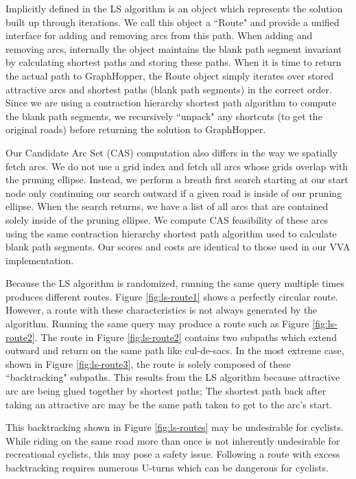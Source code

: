 \documentclass[11pt]{article}
\begin{document}
Implicitly defined in the LS algorithm is an object which represents the solution built up through iterations. We call this object a ``Route" and provide a unified interface for adding and removing arcs from this path. When adding and removing arcs, internally the object maintains the blank path segment invariant by calculating shortest paths and storing these paths. When it is time to return the actual path to GraphHopper, the Route object simply iterates over stored attractive arcs and shortest paths (blank path segments) in the correct order. Since we are using a contraction hierarchy shortest path algorithm to compute the blank path segments, we recursively ``unpack" any shortcuts (to get the original roads) before returning the solution to GraphHopper. 

Our Candidate Arc Set (CAS) computation also differs in the way we spatially fetch arcs. We do not use a grid index and fetch all arcs whose grids overlap with the pruning ellipse.  Instead, we perform a breath first search starting at our start node only continuing our search outward if a given road is inside of our pruning ellipse. When the search returns, we have a list of all arcs that are contained solely inside of the pruning ellipse. We compute CAS feasibility of these arcs using the same contraction hierarchy shortest path algorithm used to calculate blank path segments. Our scores and costs are identical to those used in our VVA implementation.

Because the LS algorithm is randomized, running the same query multiple times produces different routes. Figure \ref{fig:ls-route1} shows a perfectly circular route. However, a route with these characteristics is not always generated by the algorithm. Running the same query may produce a route such as Figure \ref{fig:ls-route2}. The route in Figure \ref{fig:ls-route2} contains two subpaths which extend outward and return on the same path like cul-de-sacs. In the most extreme case, shown in Figure \ref{fig:ls-route3}, the route is solely composed of these ``backtracking" subpaths. This results from the LS algorithm because attractive arc are being glued together by shortest paths; The shortest path back after taking an attractive arc may be the same path taken to get to the arc's start.

This backtracking shown in Figure \ref{fig:ls-routes} may be undesirable for cyclists. While riding on the same road more than once is not inherently undesirable for recreational cyclists, this may pose a safety issue. Following a route with excess backtracking requires numerous U-turns which can be dangerous for cyclists.  
\end{document}
